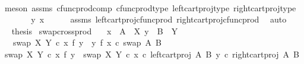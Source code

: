\begin{isabellebody}
\ \ \ \ \isamarkupfalse%
\ {\isacharparenleft}{\kern0pt}meson\ assms\ cfunc{\isacharunderscore}{\kern0pt}prod{\isacharunderscore}{\kern0pt}comp\ cfunc{\isacharunderscore}{\kern0pt}prod{\isacharunderscore}{\kern0pt}type\ left{\isacharunderscore}{\kern0pt}cart{\isacharunderscore}{\kern0pt}proj{\isacharunderscore}{\kern0pt}type\ right{\isacharunderscore}{\kern0pt}cart{\isacharunderscore}{\kern0pt}proj{\isacharunderscore}{\kern0pt}type{\isacharparenright}{\kern0pt}\isanewline
\ \ \isamarkupfalse%
\ \isamarkupfalse%
\ {\isachardoublequoteopen}{\isachardot}{\kern0pt}{\isachardot}{\kern0pt}{\isachardot}{\kern0pt}\ {\isacharequal}{\kern0pt}\ {\isasymlangle}y{\isacharcomma}{\kern0pt}\ x{\isasymrangle}{\isachardoublequoteclose}\isanewline
\ \ \ \ \isamarkupfalse%
\ assms\ left{\isacharunderscore}{\kern0pt}cart{\isacharunderscore}{\kern0pt}proj{\isacharunderscore}{\kern0pt}cfunc{\isacharunderscore}{\kern0pt}prod\ right{\isacharunderscore}{\kern0pt}cart{\isacharunderscore}{\kern0pt}proj{\isacharunderscore}{\kern0pt}cfunc{\isacharunderscore}{\kern0pt}prod\ \isamarkupfalse%
\ auto\isanewline
\ \ \isamarkupfalse%
\ \isamarkupfalse%
\ {\isacharquery}{\kern0pt}thesis\isacommand{{\isachardot}{\kern0pt}}\isamarkupfalse%
\isanewline
{}\isamarkupfalse%
%
\endisatagproof
{\isafoldproof}%
%
\isadelimproof
\isanewline
%
\endisadelimproof
\isanewline
{}\isamarkupfalse%
\ swap{\isacharunderscore}{\kern0pt}cross{\isacharunderscore}{\kern0pt}prod{\isacharcolon}{\kern0pt}\isanewline
\ \ \ {\isachardoublequoteopen}x\ {\isacharcolon}{\kern0pt}\ A\ {\isasymrightarrow}\ X{\isachardoublequoteclose}\ {\isachardoublequoteopen}y\ {\isacharcolon}{\kern0pt}\ B\ {\isasymrightarrow}\ Y{\isachardoublequoteclose}\isanewline
\ \ \ {\isachardoublequoteopen}swap\ X\ Y\ {\isasymcirc}\isactrlsub c\ {\isacharparenleft}{\kern0pt}x\ {\isasymtimes}\isactrlsub f\ y{\isacharparenright}{\kern0pt}\ {\isacharequal}{\kern0pt}\ {\isacharparenleft}{\kern0pt}y\ {\isasymtimes}\isactrlsub f\ x{\isacharparenright}{\kern0pt}\ {\isasymcirc}\isactrlsub c\ swap\ A\ B{\isachardoublequoteclose}\isanewline
%
\isadelimproof
%
\endisadelimproof
%
\isatagproof
{}\isamarkupfalse%
\ {\isacharminus}{\kern0pt}\isanewline
\ \ \isamarkupfalse%
\ {\isachardoublequoteopen}swap\ X\ Y\ {\isasymcirc}\isactrlsub c\ {\isacharparenleft}{\kern0pt}x\ {\isasymtimes}\isactrlsub f\ y{\isacharparenright}{\kern0pt}\ {\isacharequal}{\kern0pt}\ swap\ X\ Y\ {\isasymcirc}\isactrlsub c\ {\isasymlangle}x\ {\isasymcirc}\isactrlsub c\ left{\isacharunderscore}{\kern0pt}cart{\isacharunderscore}{\kern0pt}proj\ A\ B{\isacharcomma}{\kern0pt}\ y\ {\isasymcirc}\isactrlsub c\ right{\isacharunderscore}{\kern0pt}cart{\isacharunderscore}{\kern0pt}proj\ A\ B{\isasymrangle}{\isachardoublequoteclose}\isanewline

\end{isabellebody}
